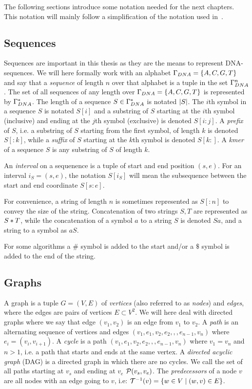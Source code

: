 The following sections introduce some notation needed for the next chapters. This notation will mainly follow a simplification of the notation used in~\cite{gcsa1}.
\subsection{Sequences}
Sequences are important in this thesis as they are the means to represent DNA-sequences.
We will here formally work with an alphabet $\Gamma_{DNA} = \left\{A, C, G, T\right\}$ and say that a \emph{sequence} of length $n$ over that alphabet is a tuple in the set $\Gamma_{DNA}^n$.
The set of all sequences of any length over $\Gamma_{DNA} = \left\{A, C, G, T\right\}$ is  represented by $\Gamma_{DNA}^*$.
The length of a sequence $S \in \Gamma_{DNA}^*$ is notated $\left|S\right|$.
The $i$th symbol in a sequence $S$ is notated $S[i]$ and a substring of $S$ starting at the $i$th symbol (inclusive) and ending at the $j$th symbol (exclusive) is denoted $S[i:j]$.
A \emph{prefix} of $S$, i.e. a substring of $S$ starting from the first symbol, of length $k$ is denoted $S[:k]$, while a \emph{suffix} of $S$ starting at the $k$th symbol is denoted $S[k:]$.
A \emph{kmer} of a sequence $S$ is any substring of $S$ of length $k$.

An \emph{interval} on a sequenence is a tuple of start and end position $(s, e)$.
For an interval $i_S=(s, e)$, the notation $S[i_S]$ will mean the subsequence between the start and end coordinate $S[s:e]$.

For convenience, a string of length $n$ is sometimes represented as $S[:n]$ to convey the size of the string.
Concatenation of two strings $S, T$ are represented as $S * T$, while the concatenation of a symbol $a$ to a string $S$ is denoted $Sa$, and a string to a symbol as $aS$.

For some algorithms a $\#$ symbol is added to the start and/or a $\$$ symbol is added to the end of the string.

\subsection{Graphs}
A graph is a tuple $G=(V, E)$ of \emph{vertices} (also referred to as \emph{nodes}) and \emph{edges}, where the edges are pairs of vertices $E \subset V^2$.
We will here deal with directed graphs where we say that edge $(v_1, v_2)$ is an edge from $v_1$ to $v_2$.
A \emph{path} is an alternating sequence of vertices and edges $(v_1, e_1, v_2, e_2,,,e_{n-1}, v_n)$ where $e_i = (v_i, v_{i+1})$.
A \emph{cycle} is a path $(v_1, e_1, v_2, e_2,,,e_{n-1}, v_n)$ where $v_1=v_n$ and $n>1$, i.e. a path that starts and ends at the same vertex.
A \emph{directed acyclic graph} (DAG) is a directed graph in which there are no cycles.
We call the set of all paths starting at $v_s$ and ending at $v_e$ $\mathcal{P}(v_s, v_e)$.
The \emph{predecessors} of a node $v$ are all nodes with an edge going to $v$, i.e: $\mathcal{T}^{-1}(v) = \left\{w \in V \mid (w, v) \in E\right\}$.

